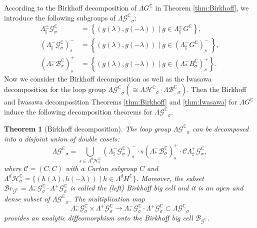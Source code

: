 \documentclass[12pt]{amsart}
\newtheorem{Theorem}{Theorem}[section]
\theoremstyle{definition}
\theoremstyle{remark}
\numberwithin{equation}{section}
\begin{document}
 According to the Birkhoff decomposition of ${\Lambda G^{\mathbb C}}$ in Theorem \ref{thm:Birkhoff}, 
 we introduce the following subgroups of ${\Lambda {\mathcal G}^{\mathbb C}}_{\sigma}$:
\begin{align*}
\Lambda_{\sharp}^{\pm} {\mathcal G}^{\mathbb C}_{\sigma}
& =\left\{ (g({\lambda}), g(-{\lambda})) \;|\; g \in 
 \Lambda_{\sharp}^{\pm} G^{\mathbb C} \right\},\\
(\Lambda_{\sharp}^{-} {\mathcal G}^{\mathbb C}_{\sigma})_s^{-}
& =\left\{ (g({\lambda}), g(-{\lambda})) \;|\; g \in 
 (\Lambda_{\sharp}^{-} G^{\mathbb C})_s^{-}\ \right\}, \\
(\Lambda_{*}^{-} \mathcal B^{\mathbb C}_{\sigma})_s^{+}
& =\left\{ (g({\lambda}), g(-{\lambda})) \;|\; g \in 
 (\Lambda_{*}^{-} B^{\mathbb C}_{\sigma})_s^{+} \right\}.
\end{align*}
 Now we consider the Birkhoff decomposition as well as the
 Iwasawa decomposition for the loop group
 ${\Lambda {\mathcal G}^{\mathbb C}}_{\sigma} (\cong {\Lambda {\mathcal H}^{\mathbb C}}_{\sigma} \cdot {\Lambda {\mathcal B}^{\mathbb C}}_{\sigma})$.
 Then the Birkhoff and Iwasawa decomposition Theorems \ref{thm:Birkhoff} 
 and \ref{thm:Iwasawa} for $\Lambda{G}^\mathbb{C}$ induce the following 
 decomposition theorems for ${\Lambda {\mathcal G}^{\mathbb C}}_{\sigma}$. 
 \begin{Theorem}[Birkhoff decomposition]
 \label{thm:Birkhoffdouble}
 The loop group ${\Lambda {\mathcal G}^{\mathbb C}}_{\sigma}$ 
 can be decomposed into a disjoint union of double cosets:
\begin{equation*}
 {\Lambda {\mathcal G}^{\mathbb C}}_{\sigma} = \bigcup_{s \in \Lambda^d \mathcal H^{\mathbb C}_{\sigma}}
 (\Lambda_{\sharp}^{-} {\mathcal G}^{\mathbb C}_{\sigma})_s^{-} \cdot  
 s(\Lambda_{*}^{-} \mathcal B^{\mathbb C}_{\sigma})_s^{+}
 \cdot \mathcal C \Lambda_{\sharp}^{+} {\mathcal G}^{\mathbb C}_{\sigma},
\end{equation*}
 where $\mathcal  C = (\mathit C, \mathit C)$ with a Cartan subgroup $\mathit C$ 
 and $\Lambda^d \mathcal H^{\mathbb C}_{\sigma} = \{(h({\lambda}), h(-{\lambda}))\;|\;
 h \in \Lambda^d H^{\mathbb C}\}$.
 Moreover, the subset $\mathcal Br_{\mathcal G^{\mathbb C}} = 
  \Lambda_{*}^{-} {\mathcal G}^{\mathbb C}_{\sigma} 
 \cdot \Lambda^{+} {\mathcal G}^{\mathbb C}_{\sigma}$ 
 is called the {\rm (left) Birkhoff big cell} and it is an open and dense subset of 
 ${\Lambda {\mathcal G}^{\mathbb C}}_{\sigma}$. The multiplication map 
\begin{equation*}
\Lambda_{*}^{-} {\mathcal G}^{\mathbb C}_{\sigma} 
 \times \Lambda^{+} {\mathcal G}^{\mathbb C}_{\sigma}
 \to    
\Lambda_{*}^{-} {\mathcal G}^{\mathbb C}_{\sigma} 
 \cdot \Lambda^{+} {\mathcal G}^{\mathbb C}_{\sigma}
 \subset {\Lambda {\mathcal G}^{\mathbb C}}_{\sigma}
\end{equation*}
 provides an analytic diffeomorphism 
 onto  the Birkhoff big cell  $\mathcal B_{\mathcal G^{\mathbb C}}$.
\end{Theorem}
\end{document}
